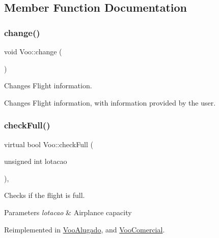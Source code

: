 \subsection{Member Function Documentation}
\mbox{\label{class_voo_afe83ba69fe20c5868a1c34eddf97a6f5}} 
\subsubsection{\texorpdfstring{change()}{change()}}
{\footnotesize\ttfamily void Voo\+::change (\begin{DoxyParamCaption}{ }\end{DoxyParamCaption})}



Changes Flight information. 

Changes Flight information, with information provided by the user. \mbox{\label{class_voo_ae8c7d7254ca23ed23f762a9b867aba91}} 
\subsubsection{\texorpdfstring{check\+Full()}{checkFull()}}
{\footnotesize\ttfamily virtual bool Voo\+::check\+Full (\begin{DoxyParamCaption}\item[{unsigned int}]{lotacao }\end{DoxyParamCaption})\hspace{0.3cm}{\ttfamily [inline]}, {\ttfamily [virtual]}}



Checks if the flight is full. 


\begin{DoxyParams}{Parameters}
{\em lotacao} & Airplance capacity \\
\hline
\end{DoxyParams}


Reimplemented in \hyperlink{class_voo_alugado_a6ab1f96978f09e8c3477ee9e84259225}{Voo\+Alugado}, and \hyperlink{class_voo_comercial_a4658609ace8bb62da8ec845252d84c59}{Voo\+Comercial}.

\mbox{\label{class_voo_a3268d6d5ac51e31ebbdb11fd637544c1}} 

